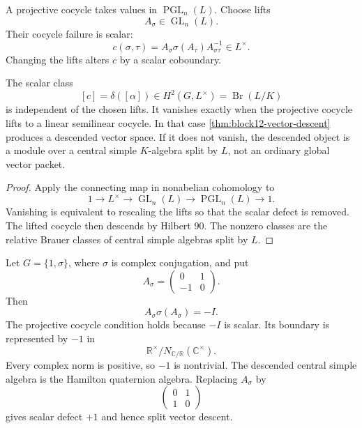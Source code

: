 A projective cocycle takes values in \(\operatorname{PGL}_n(L)\).  Choose lifts
\[
 A_\sigma\in\operatorname{GL}_n(L).
\]
Their cocycle failure is scalar:
\[
 \boxed{
 c(\sigma,\tau)
 =A_\sigma\sigma(A_\tau)A_{\sigma\tau}^{-1}
 \in L^\times.}
 \tag{12.18}
\]
Changing the lifts alters \(c\) by a scalar coboundary.

\begin{theorem}
\label{thm:block12-brauer}
The scalar class
\[
 \boxed{
 [c]=\delta([\alpha])
 \in H^2(G,L^\times)
 =\operatorname{Br}(L/K)}
 \tag{12.19}
\]
is independent of the chosen lifts.  It vanishes exactly when the projective cocycle lifts to a linear semilinear cocycle.  In that case \cref{thm:block12-vector-descent} produces a descended vector space.  If it does not vanish, the descended object is a module over a central simple \(K\)-algebra split by \(L\), not an ordinary global vector packet.
\end{theorem}

\begin{proof}
Apply the connecting map in nonabelian cohomology to
\[
 1\longrightarrow L^\times
 \longrightarrow\operatorname{GL}_n(L)
 \longrightarrow\operatorname{PGL}_n(L)
 \longrightarrow1.
\]
Vanishing is equivalent to rescaling the lifts so that the scalar defect is removed.  The lifted cocycle then descends by Hilbert 90.  The nonzero classes are the relative Brauer classes of central simple algebras split by \(L\).
\end{proof}

\begin{example}
Let \(G=\{1,\sigma\}\), where \(\sigma\) is complex conjugation, and put
\[
 A_\sigma=
 \begin{pmatrix}
 0&1\\
 -1&0
 \end{pmatrix}.
\]
Then
\[
 A_\sigma\sigma(A_\sigma)=-I.
\]
The projective cocycle condition holds because \(-I\) is scalar.  Its boundary is represented by \(-1\) in
\[
 \mathbb R^\times/N_{\mathbb C/\mathbb R}(\mathbb C^\times).
\]
Every complex norm is positive, so \(-1\) is nontrivial.  The descended central simple algebra is the Hamilton quaternion algebra.  Replacing \(A_\sigma\) by
\[
 \begin{pmatrix}0&1\\1&0\end{pmatrix}
\]
gives scalar defect \(+1\) and hence split vector descent.
\end{example}

